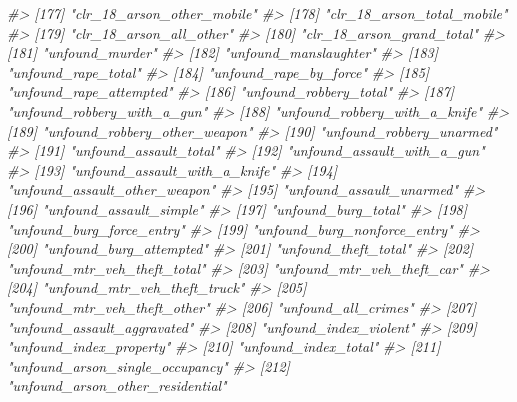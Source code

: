 \documentclass[
]{krantz}
\makeatletter
\newenvironment{Shaded}{\begin{snugshade}}{\end{snugshade}}
\newcommand{\CommentTok}[1]{\textcolor[rgb]{0.37,0.37,0.37}{\textit{#1}}}
\newenvironment{kframe}{%
\medskip{}
\setlength{\fboxsep}{.8em}
 \def\at@end@of@kframe{}%
 \ifinner\ifhmode%
  \def\at@end@of@kframe{\end{minipage}}%
  \begin{minipage}{\columnwidth}%
 \fi\fi%
 \def\FrameCommand##1{\hskip\@totalleftmargin \hskip-\fboxsep
 \colorbox{shadecolor}{##1}\hskip-\fboxsep
     \hskip-\linewidth \hskip-\@totalleftmargin \hskip\columnwidth}%
 \MakeFramed {\advance\hsize-\width
   \@totalleftmargin\z@ \linewidth\hsize
   \@setminipage}}%
 {\par\unskip\endMakeFramed%
 \at@end@of@kframe}
\renewenvironment{Shaded}{\begin{kframe}}{\end{kframe}}
\makeatother
\begin{document}
\begin{Shaded}
\begin{Highlighting}[]
\CommentTok{\#\textgreater{} [177] "clr\_18\_arson\_other\_mobile"       }
\CommentTok{\#\textgreater{} [178] "clr\_18\_arson\_total\_mobile"       }
\CommentTok{\#\textgreater{} [179] "clr\_18\_arson\_all\_other"          }
\CommentTok{\#\textgreater{} [180] "clr\_18\_arson\_grand\_total"        }
\CommentTok{\#\textgreater{} [181] "unfound\_murder"                  }
\CommentTok{\#\textgreater{} [182] "unfound\_manslaughter"            }
\CommentTok{\#\textgreater{} [183] "unfound\_rape\_total"              }
\CommentTok{\#\textgreater{} [184] "unfound\_rape\_by\_force"           }
\CommentTok{\#\textgreater{} [185] "unfound\_rape\_attempted"          }
\CommentTok{\#\textgreater{} [186] "unfound\_robbery\_total"           }
\CommentTok{\#\textgreater{} [187] "unfound\_robbery\_with\_a\_gun"      }
\CommentTok{\#\textgreater{} [188] "unfound\_robbery\_with\_a\_knife"    }
\CommentTok{\#\textgreater{} [189] "unfound\_robbery\_other\_weapon"    }
\CommentTok{\#\textgreater{} [190] "unfound\_robbery\_unarmed"         }
\CommentTok{\#\textgreater{} [191] "unfound\_assault\_total"           }
\CommentTok{\#\textgreater{} [192] "unfound\_assault\_with\_a\_gun"      }
\CommentTok{\#\textgreater{} [193] "unfound\_assault\_with\_a\_knife"    }
\CommentTok{\#\textgreater{} [194] "unfound\_assault\_other\_weapon"    }
\CommentTok{\#\textgreater{} [195] "unfound\_assault\_unarmed"         }
\CommentTok{\#\textgreater{} [196] "unfound\_assault\_simple"          }
\CommentTok{\#\textgreater{} [197] "unfound\_burg\_total"              }
\CommentTok{\#\textgreater{} [198] "unfound\_burg\_force\_entry"        }
\CommentTok{\#\textgreater{} [199] "unfound\_burg\_nonforce\_entry"     }
\CommentTok{\#\textgreater{} [200] "unfound\_burg\_attempted"          }
\CommentTok{\#\textgreater{} [201] "unfound\_theft\_total"             }
\CommentTok{\#\textgreater{} [202] "unfound\_mtr\_veh\_theft\_total"     }
\CommentTok{\#\textgreater{} [203] "unfound\_mtr\_veh\_theft\_car"       }
\CommentTok{\#\textgreater{} [204] "unfound\_mtr\_veh\_theft\_truck"     }
\CommentTok{\#\textgreater{} [205] "unfound\_mtr\_veh\_theft\_other"     }
\CommentTok{\#\textgreater{} [206] "unfound\_all\_crimes"              }
\CommentTok{\#\textgreater{} [207] "unfound\_assault\_aggravated"      }
\CommentTok{\#\textgreater{} [208] "unfound\_index\_violent"           }
\CommentTok{\#\textgreater{} [209] "unfound\_index\_property"          }
\CommentTok{\#\textgreater{} [210] "unfound\_index\_total"             }
\CommentTok{\#\textgreater{} [211] "unfound\_arson\_single\_occupancy"  }
\CommentTok{\#\textgreater{} [212] "unfound\_arson\_other\_residential" }

\end{Highlighting}
\end{Shaded}
\end{document}
